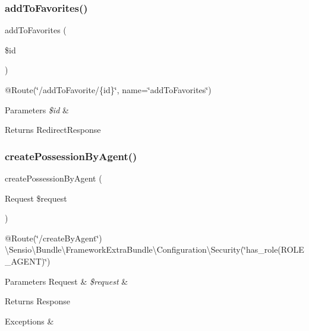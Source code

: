\subsubsection{\texorpdfstring{addToFavorites()}{addToFavorites()}}
{\footnotesize\ttfamily add\+To\+Favorites (\begin{DoxyParamCaption}\item[{}]{\$id }\end{DoxyParamCaption})}

@\+Route(\char`\"{}/add\+To\+Favorite/\{id\}\char`\"{}, name=\char`\"{}add\+To\+Favorites\char`\"{}) 
\begin{DoxyParams}{Parameters}
{\em \$id} & \\
\hline
\end{DoxyParams}
\begin{DoxyReturn}{Returns}
Redirect\+Response 
\end{DoxyReturn}
\mbox{\label{class_app_1_1_controller_1_1_possession_controller_a310b843253754fae7923d7b6a4dbb353}} 
\subsubsection{\texorpdfstring{createPossessionByAgent()}{createPossessionByAgent()}}
{\footnotesize\ttfamily create\+Possession\+By\+Agent (\begin{DoxyParamCaption}\item[{Request}]{\$request }\end{DoxyParamCaption})}

@\+Route(\char`\"{}/create\+By\+Agent\char`\"{}) \textbackslash{}Sensio\textbackslash{}\+Bundle\textbackslash{}\+Framework\+Extra\+Bundle\textbackslash{}\+Configuration\textbackslash{}\+Security(\char`\"{}has\+\_\+role(\textquotesingle{}\+R\+O\+L\+E\+\_\+\+A\+G\+E\+N\+T\textquotesingle{})\char`\"{}) 
\begin{DoxyParams}[1]{Parameters}
Request & {\em \$request} & \\
\hline
\end{DoxyParams}
\begin{DoxyReturn}{Returns}
Response 
\end{DoxyReturn}

\begin{DoxyExceptions}{Exceptions}
{\em } & \\
\hline
\end{DoxyExceptions}
\mbox{\label{class_app_1_1_controller_1_1_possession_controller_a002fbe18bc0d3456d063eb8c8a9adcae}} 
